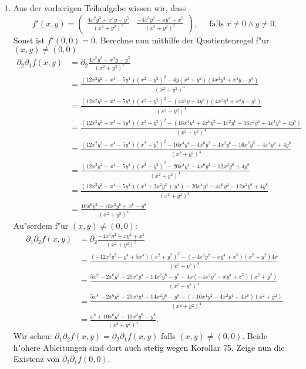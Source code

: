 \documentclass[a4paper, landscape,twocolumn,fontsize=8pt]{scrartcl}
\theoremstyle{plain}
\begin{document}
\begin{enumerate}[label=(\roman*)]
    \item Aus der vorherigen Teilaufgabe wissen wir, dass 
    \[
        f'(x,y) = \begin{pmatrix} \frac{4x^2y^3+x^4y-y^5}{(x^2+y^2)^2} &  \frac{-4x^3y^2-xy^4+x^5}{(x^2+y^2)^2} \end{pmatrix}, \quad \text{ falls $x \neq 0 \land y \neq 0$}.
    \]
    Sonst ist $f'(0,0) = 0$.
    Berechne nun mithilfe der Quotientenregel f"ur $(x,y) \neq (0,0)$
    \begin{align*}
        \partial_2\partial_1 f(x,y) &= \partial_2 \frac{4x^2y^3+x^4y-y^5}{(x^2+y^2)^2}\\
        &=\frac{(12x^2y^2+x^4-5y^4)(x^2+y^2)^2-4y(x^2+y^2)(4x^2y^3+x^4y-y^5)}{(x^2+y^2)^4} \\
        &= \frac{(12x^2y^2+x^4-5y^4)(x^2+y^2)^2-(4x^2y+4y^3)(4x^2y^3+x^4y-y^5)}{(x^2+y^2)^4} \\
        &= \frac{(12x^2y^2+x^4-5y^4)(x^2+y^2)^2-(16x^4y^4+4x^6y^2-4x^2y^6+16x^2y^6+4x^4y^4-4y^8)}{(x^2+y^2)^4}\\
        &= \frac{(12x^2y^2+x^4-5y^4)(x^2+y^2)^2-16x^4y^4-4x^6y^2+4x^2y^6-16x^2y^6-4x^4y^4+4y^8}{(x^2+y^2)^4} \\
        &= \frac{(12x^2y^2+x^4-5y^4)(x^2+y^2)^2-20x^4y^4-4x^6y^2-12x^2y^6+4y^8}{(x^2+y^2)^4}\\
        &= \frac{(12x^2y^2+x^4-5y^4)(x^4+2x^2y^2+y^4)-20x^4y^4-4x^6y^2-12x^2y^6+4y^8}{(x^2+y^2)^4}\\
        &= \frac{10x^6y^2-10x^2y^6+x^8-y^8}{(x^2+y^2)^4}
    \end{align*}
    Au"serdem f"ur $(x,y) \neq (0,0)$:
    \begin{align*}
        \partial_1\partial_2 f(x,y) &= \partial_2\frac{-4x^3y^2-xy^4+x^5}{(x^2+y^2)^2}\\
        &= \frac{(-12x^2y^2-y^4+5x^4)(x^2+y^2)^2-(-4x^3y^2-xy^4+x^5)(x^2+y^2)4x}{(x^2+y^2)^4}\\
        &= \frac{5 x^8 - 2 x^6 y^2 - 20 x^4 y^4 - 14 x^2 y^6 - y^8-4x(-4x^3y^2-xy^4+x^5)(x^2+y^2)}{(x^2+y^2)^4} \\
        &= \frac{5 x^8 - 2 x^6 y^2 - 20 x^4 y^4 - 14 x^2 y^6 - y^8-(-16x^4y^2-4x^2y^4+4x^6)(x^2+y^2)}{(x^2+y^2)^4} \\
        &= \frac{x^8 + 10 x^6 y^2 - 10 x^2 y^6 - y^8}{(x^2+y^2)^4}.
    \end{align*}
    Wir sehen: $\partial_1\partial_2 f(x,y) = \partial_2\partial_1 f(x,y)$ falls $(x,y) \neq (0,0)$. Beide h"ohere Ableitungen sind dort auch stetig wegen Korollar 75. Zeige nun die Existenz von $\partial_2\partial_1f(0,0)$.

\end{enumerate}
\end{document}
